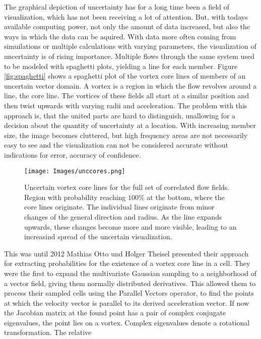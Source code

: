 \noindent The graphical depiction of uncertainty has for a long time
been a field of visualization, which has not been receiving a lot of
attention. But, with todays available computing power, not only the
amount of data increased, but also the ways in which the data can be
aquired. With data more often coming from simuilations or multiple
calculations with varying parameters, the visualization of uncertainty
is of rising importance. Multiple flows through the same system used to
be modeled with spaghetti plots, yielding a line for each member. Figure
\ref{fig:spaghetti} shows a spaghetti plot of the vortex core lines of
members of an uncertain vector domain. A vortex is a region in which the
flow revolves around a line, the core line. The vortices of these fields
all start at a similar position and then twist upwards with varying
radii and acceleration. The problem with this approach is, that the
united parts are hard to distinguish, unallowing for a decision about
the quantity of uncertainty at a location. With increasing member size,
the image becomes cluttered, but high frequency areas are not
necessarily easy to see and the visualization can not be considered
accurate without indications for error, accuracy of confidence.\\
\begin{figure}[t]
    \centering
    \texttt{[image: Images/unccores.png]}
    \caption{Uncertain vortex core lines for the full set of correlated
    flow fields. Region with probability reaching $100\%$ at the bottom,
    where the core lines originate. The individual lines originate from
    minor changes of the general direction and radius. As the line expands
    upwards, these changes become more and more visible, leading to an
    increasind spread of the uncertain visualization.}
    \label{fig:UVC}
\end{figure}
\indent This was until 2012 Mathias Otto und Holger Theisel presented
their approach for extracting probabilities for the existence of a
vortex core line in a cell. They were the first to expand the
multivariate Gaussian sampling to a neighborhood of a vector field,
giving them normally distributed derivatives. This allowed them to
process their sampled cells using the Parallel Vectors operator, to find
the points at which the velocity vector is parallel to its derived
acceleration vector. If now the Jacobian matrix at the found point has a
pair of complex conjugate eigenvalues, the point lies on a vortex.
Complex eigenvalues denote a rotational transformation. The relative

